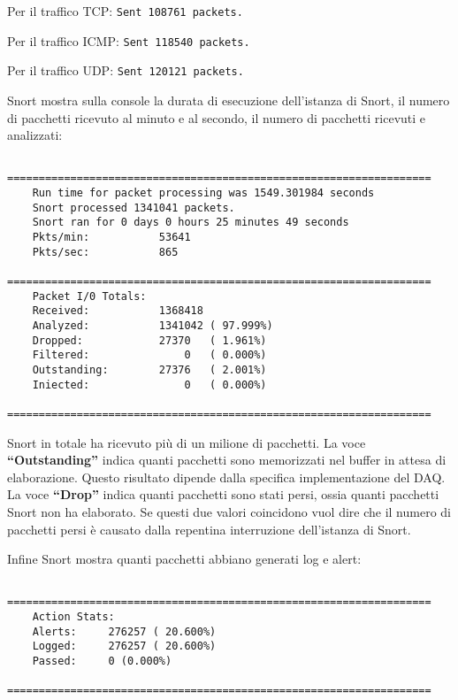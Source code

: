 Per il traffico TCP: \texttt{Sent 108761 packets.}

Per il traffico ICMP: \texttt{Sent 118540 packets.}

Per il traffico UDP: \texttt{Sent 120121 packets.}

Snort mostra sulla console la durata di esecuzione dell'istanza di Snort, il numero di pacchetti ricevuto al minuto e al secondo, il numero di pacchetti ricevuti e analizzati:

\begin{verbatim}
    ===================================================================
    Run time for packet processing was 1549.301984 seconds
    Snort processed 1341041 packets.
    Snort ran for 0 days 0 hours 25 minutes 49 seconds
    Pkts/min:           53641
    Pkts/sec:           865
    ===================================================================
    Packet I/0 Totals:
    Received:           1368418
    Analyzed:           1341042 ( 97.999%)
    Dropped:            27370   ( 1.961%)
    Filtered:               0   ( 0.000%)
    Outstanding:        27376   ( 2.001%)
    Iniected:               0   ( 0.000%)
    ===================================================================
\end{verbatim}

Snort in totale ha ricevuto più di un milione di pacchetti.
La voce \textbf{``Outstanding''} indica quanti pacchetti sono memorizzati nel buffer in attesa di elaborazione. Questo risultato dipende dalla specifica implementazione del DAQ.
La voce \textbf{``Drop''} indica quanti pacchetti sono stati persi, ossia quanti pacchetti Snort non ha elaborato.
Se questi due valori coincidono vuol dire che il numero di pacchetti persi è causato dalla repentina interruzione dell'istanza di Snort.

Infine Snort mostra quanti pacchetti abbiano generati log e alert:

\begin{verbatim}
    ===================================================================
    Action Stats:
    Alerts:     276257 ( 20.600%)
    Logged:     276257 ( 20.600%)
    Passed:     0 (0.000%)
    ===================================================================
\end{verbatim}

